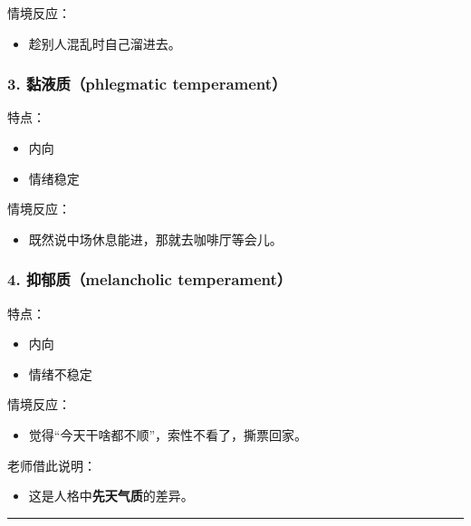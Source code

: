 \documentclass[
  chinese,
  9pt,
  a4paper,
]{ctexart}
\providecommand{\tightlist}{%
  \setlength{\itemsep}{0pt}\setlength{\parskip}{0pt}}
\begin{document}
情境反应：

\begin{itemize}
\tightlist
\item
  趁别人混乱时自己溜进去。
\end{itemize}

\subsubsection{3. 黏液质（phlegmatic
temperament）}\label{ux9ecfux6db2ux8d28phlegmatic-temperament}

特点：

\begin{itemize}
\tightlist
\item
  内向
\item
  情绪稳定
\end{itemize}

情境反应：

\begin{itemize}
\tightlist
\item
  既然说中场休息能进，那就去咖啡厅等会儿。
\end{itemize}

\subsubsection{4. 抑郁质（melancholic
temperament）}\label{ux6291ux90c1ux8d28melancholic-temperament}

特点：

\begin{itemize}
\tightlist
\item
  内向
\item
  情绪不稳定
\end{itemize}

情境反应：

\begin{itemize}
\tightlist
\item
  觉得``今天干啥都不顺''，索性不看了，撕票回家。
\end{itemize}

老师借此说明：

\begin{itemize}
\tightlist
\item
  这是人格中\textbf{先天气质}的差异。
\end{itemize}

\begin{center}\rule{0.5\linewidth}{0.5pt}\end{center}
\end{document}
